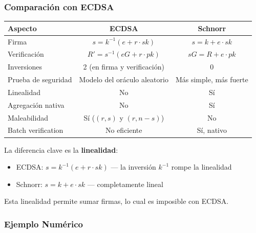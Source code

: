 \documentclass[11pt,a4paper,twoside,openright]{book}
\theoremstyle{definition}
\theoremstyle{plain}
\theoremstyle{remark}
\begin{document}
\subsubsection{Comparación con ECDSA}

\begin{center}
\begin{tabular}{lcc}
\toprule
\textbf{Aspecto} & \textbf{ECDSA} & \textbf{Schnorr} \\
\midrule
Firma & $s = k^{-1}(e + r \cdot sk)$ & $s = k + e \cdot sk$ \\
Verificación & $R' = s^{-1}(eG + r \cdot pk)$ & $sG = R + e \cdot pk$ \\
Inversiones & 2 (en firma y verificación) & 0 \\
Prueba de seguridad & Modelo del oráculo aleatorio & Más simple, más fuerte \\
Linealidad & No & Sí \\
Agregación nativa & No & Sí \\
Maleabilidad & Sí ($(r, s)$ y $(r, n-s)$) & No \\
Batch verification & No eficiente & Sí, nativo \\
\bottomrule
\end{tabular}
\end{center}

\begin{keyidea}
La diferencia clave es la \textbf{linealidad}:
\begin{itemize}
    \item ECDSA: $s = k^{-1}(e + r \cdot sk)$ — la inversión $k^{-1}$ rompe la linealidad
    \item Schnorr: $s = k + e \cdot sk$ — completamente lineal
\end{itemize}

Esta linealidad permite sumar firmas, lo cual es imposible con ECDSA.
\end{keyidea}

\subsubsection{Ejemplo Numérico}
\end{document}
